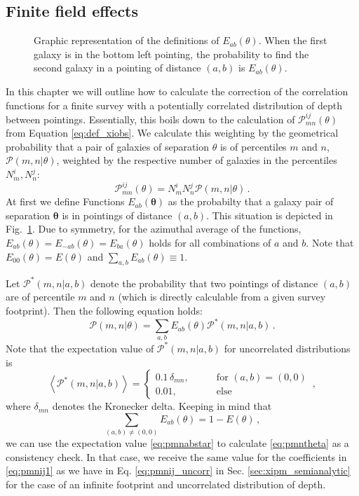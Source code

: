 \documentclass[referee]{aa} %
\renewcommand{\[}{\begin{equation}}
\renewcommand{\]}{\end{equation}}
\def\b#1{\bm{#1}}
\def\la{\left<}
\def\ra{\right>}
\begin{document}
\begin{appendix}
\section{Finite field effects}
\label{sec:expand_eoftheta}
\begin{figure}
    \centering
    \def\svgwidth{200pt}    
      
    \caption{Graphic representation of the definitions of $E_{ab}(\theta)$. When the first galaxy is in the bottom left pointing, the probability to find the second galaxy in a pointing of distance $(a,b)$ is $E_{ab}(\theta)$.}
    \label{fig:expand_etheta}
\end{figure}
In this chapter we will outline how to calculate the correction of the correlation functions for a finite survey with a potentially correlated distribution of depth between pointings. Essentially, this boils down to the calculation of $\mathcal{P}_{mn}^{ij}(\theta)$ from Equation \eqref{eq:def_xiobs}. We calculate this weighting by the geometrical probability that a pair of galaxies of separation $\theta$ is of percentiles $m$ and $n$, $\mathcal{P}(m,n|\theta)$, weighted by the respective number of galaxies in the percentiles $N_m^i,N_n^j$: \[
\mathcal{P}_{mn}^{ij}(\theta) = N_m^iN_n^j\mathcal{P}(m,n|\theta)\, .
\label{eq:pmnij1}
\]
 At first we define Functions $E_{ab}(\b\theta)$ as the probabilty that a galaxy pair of separation $\b\theta$ is in pointings of distance $(a,b)$. This situation is depicted in Fig.~\ref{fig:expand_etheta}. Due to symmetry, for the azimuthal average of the functions, $E_{ab}(\theta) = E_{-ab}(\theta) = E_{ba}(\theta)$ holds for all combinations of $a$ and $b$. Note that $E_{00}(\theta)=E(\theta)$ and $\sum_{a,b}E_{ab}(\theta)\equiv 1$.

Let $\mathcal{P}^*(m,n|a,b)$ denote the probability that two pointings of distance $(a,b)$ are of percentile $m$ and $n$ (which is directly calculable from a given survey footprint). 
Then the following equation holds: \[
\mathcal{P}(m,n|\theta) = \sum_{a,b} E_{ab}(\theta)\mathcal{P}^*(m,n|a,b)\, .
\label{eq:pmntheta}
\]
Note that the expectation value of $\mathcal{P}^*(m,n|a,b)$ for uncorrelated distributions is \[
\la \mathcal{P}^*(m,n|a,b)\ra = \begin{cases}
0.1\,\delta_{mn},\qquad & \text{for }(a,b)=(0,0) \\
0.01, & \text{else}
\end{cases}\, ,
\label{eq:pmnabstar}
\]
where $\delta_{mn}$ denotes the Kronecker delta. Keeping in mind that \[
\sum_{(a,b)\neq (0,0)} E_{ab}(\theta) = 1-E(\theta)\, ,
\]
we can use the expectation value \eqref{eq:pmnabstar} to calculate \eqref{eq:pmntheta} as a consistency check. In that case, we receive the same value for the coefficients in \eqref{eq:pmnij1} as we have in Eq. \eqref{eq:pmnij_uncorr} in Sec. \ref{sec:xipm_semianalytic} for the case of an infinite footprint and uncorrelated distribution of depth.


\end{appendix}
\end{document}
